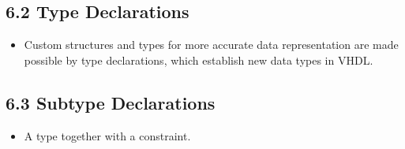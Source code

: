 \documentclass[a4paper,12pt]{article}
\begin{document}
	\subsection*{6.2 Type Declarations}
	\begin{itemize}
		\item Custom structures and types for more accurate data representation are made possible by type declarations, which establish new data types in VHDL.
	\end{itemize}
	
	\subsection*{6.3 Subtype Declarations}
	\begin{itemize}
		\item A type together with a constraint.
	\end{itemize}
	
	
\end{document}

